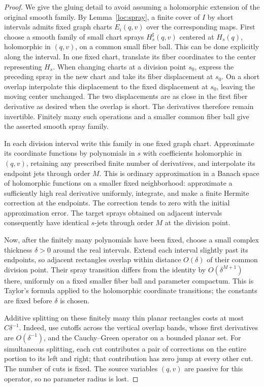 \begin{proof}
We give the gluing detail to avoid assuming a holomorphic extension of
the original smooth family. By Lemma~\ref{loc:spray}, a finite cover of
$I$ by short intervals admits fixed graph charts
$E_i(q,v)$ over the corresponding maps. First choose a smooth family of
small chart sprays $H_s^\sharp(q,v)$ centered at $H_s(q)$, holomorphic in
$(q,v)$, on a common small fiber ball. This can be done explicitly along
the interval. In one fixed chart, translate its fiber coordinates to
the center representing $H_s$. When changing charts at a division point
$s_0$, express the preceding spray in the new chart and take its fiber
displacement at $s_0$. On a short overlap interpolate this displacement
to the fixed displacement at $s_0$, leaving the moving center unchanged.
The two displacements are as close in the first fiber derivative as
desired when the overlap is short. The derivatives therefore remain
invertible. Finitely many such operations and a smaller common fiber
ball give the asserted smooth spray family.

In each division interval write this family in one fixed graph chart.
Approximate its coordinate functions by polynomials in $s$ with
coefficients holomorphic in $(q,v)$, retaining any prescribed finite
number of derivatives, and interpolate its endpoint jets through order
$M$. This is ordinary approximation in a Banach space of holomorphic
functions on a smaller fixed neighborhood: approximate a sufficiently
high real derivative uniformly, integrate, and make a finite Hermite
correction at the endpoints. The correction tends to zero with the
initial approximation error. The target sprays obtained on adjacent
intervals consequently have identical $s$-jets through order $M$ at the
division point.

Now, after the finitely many polynomials have been fixed, choose a small
complex thickness $\delta>0$ around the real intervals. Extend each
interval slightly past its endpoints, so adjacent rectangles overlap
within distance $O(\delta)$ of their common division point. Their
spray transition differs from the identity by $O(\delta^{M+1})$ there,
uniformly on a fixed smaller fiber ball and parameter compactum. This
is Taylor's formula applied to the holomorphic coordinate transitions;
the constants are fixed before $\delta$ is chosen.

Additive splitting on these finitely many thin planar rectangles costs
at most $C\delta^{-1}$. Indeed, use cutoffs across the vertical overlap
bands, whose first derivatives are $O(\delta^{-1})$, and the
Cauchy--Green operator on a bounded planar set. For simultaneous
splitting, each cut contributes a pair of corrections on the entire
portion to its left and right; that contribution has zero jump at every
other cut. The number of cuts is fixed. The source variables $(q,v)$
are passive for this operator, so no parameter radius is lost.


\end{proof}
